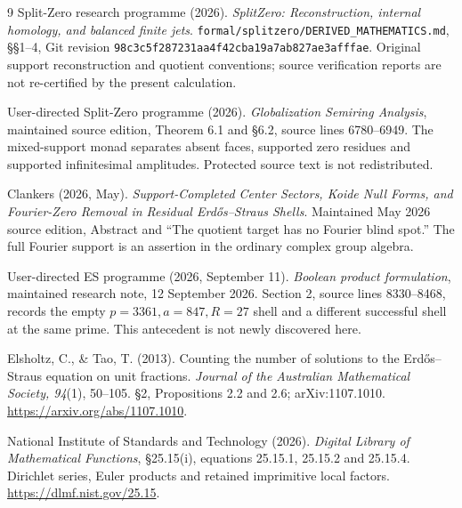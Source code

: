 \begin{thebibliography}{9}
Split-Zero research programme (2026).
\emph{SplitZero: Reconstruction, internal homology, and balanced finite jets}.
\texttt{formal/splitzero/DERIVED\_MATHEMATICS.md}, \S\S1--4,
Git revision \texttt{98c3c5f287231aa4f42cba19a7ab827ae3afffae}.
Original support reconstruction and quotient conventions; source verification
reports are not re-certified by the present calculation.

User-directed Split-Zero programme (2026).
\emph{Globalization Semiring Analysis}, maintained source edition,
Theorem 6.1 and \S6.2, source lines 6780--6949.
The mixed-support monad separates absent faces, supported zero residues and
supported infinitesimal amplitudes. Protected source text is not redistributed.

Clankers (2026, May).
\emph{Support-Completed Center Sectors, Koide Null Forms, and Fourier-Zero
Removal in Residual Erd\H{o}s--Straus Shells}.
Maintained May 2026 source edition, Abstract and
``The quotient target has no Fourier blind spot.''
The full Fourier support is an assertion in the ordinary complex group algebra.

User-directed ES programme (2026, September 11).
\emph{Boolean product formulation}, maintained research note,
12 September 2026. Section 2, source lines
8330--8468, records the empty $p=3361,a=847,R=27$ shell and a different
successful shell at the same prime. This antecedent is not newly discovered here.

Elsholtz, C., \& Tao, T. (2013).
Counting the number of solutions to the Erd\H{o}s--Straus equation on unit fractions.
\emph{Journal of the Australian Mathematical Society, 94}(1), 50--105.
\S2, Propositions 2.2 and 2.6; arXiv:1107.1010.
\url{https://arxiv.org/abs/1107.1010}.

National Institute of Standards and Technology (2026).
\emph{Digital Library of Mathematical Functions}, \S25.15(i), equations
25.15.1, 25.15.2 and 25.15.4. Dirichlet series, Euler products and retained
imprimitive local factors.
\url{https://dlmf.nist.gov/25.15}.
\end{thebibliography}
